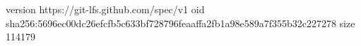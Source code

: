 version https://git-lfs.github.com/spec/v1
oid sha256:5696ec00dc26efcfb5c633bf728796feaaffa2fb1a98e589a7f355b32c227278
size 114179
